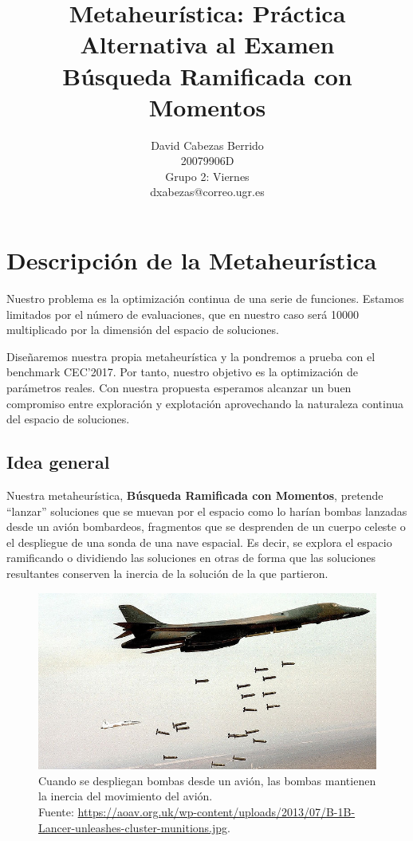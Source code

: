 \documentclass{article}
\title{\Huge Metaheurística: Práctica Alternativa al Examen \\ Búsqueda Ramificada con Momentos \vspace{10mm}}
\author{\huge David Cabezas Berrido \vspace{10mm} \\
	\huge 20079906D \vspace{10mm} \\  
  \huge Grupo 2: Viernes \vspace{10mm} \\ 
  \huge dxabezas@correo.ugr.es \vspace{10mm}}
\begin{document}
\maketitle
\newpage
\tableofcontents
\newpage

\section{Descripción de la Metaheurística}

Nuestro problema es la optimización continua de una serie de funciones. Estamos limitados por el número de evaluaciones, que en nuestro
caso será 10000 multiplicado por la dimensión del espacio de soluciones.

Diseñaremos nuestra propia metaheurística y la pondremos a prueba con el benchmark CEC'2017. Por tanto, nuestro objetivo es la optimización de parámetros
reales. Con nuestra propuesta esperamos alcanzar un buen compromiso entre exploración y explotación aprovechando la naturaleza continua del espacio
de soluciones.

\subsection{Idea general}
Nuestra metaheurística, \textbf{Búsqueda Ramificada con Momentos}, pretende ``lanzar'' soluciones que se muevan por el espacio como lo harían bombas
lanzadas desde un avión bombardeos, fragmentos que se desprenden de un cuerpo celeste o el despliegue de una sonda de una nave espacial.
Es decir, se explora el espacio ramificando o dividiendo las soluciones en otras de
forma que las soluciones resultantes conserven la inercia de la solución de la que partieron.

\begin{figure}[H]
	\centering
	\includegraphics[width=140mm]{imgs/bombs}
	\caption{Cuando se despliegan bombas desde un avión, las bombas mantienen la inercia del movimiento del avión. \\
	Fuente: \href{https://aoav.org.uk/wp-content/uploads/2013/07/B-1B-Lancer-unleashes-cluster-munitions.jpg}{https://aoav.org.uk/wp-content/uploads/2013/07/B-1B-Lancer-unleashes-cluster-munitions.jpg}.}
\end{figure}
\end{document}
